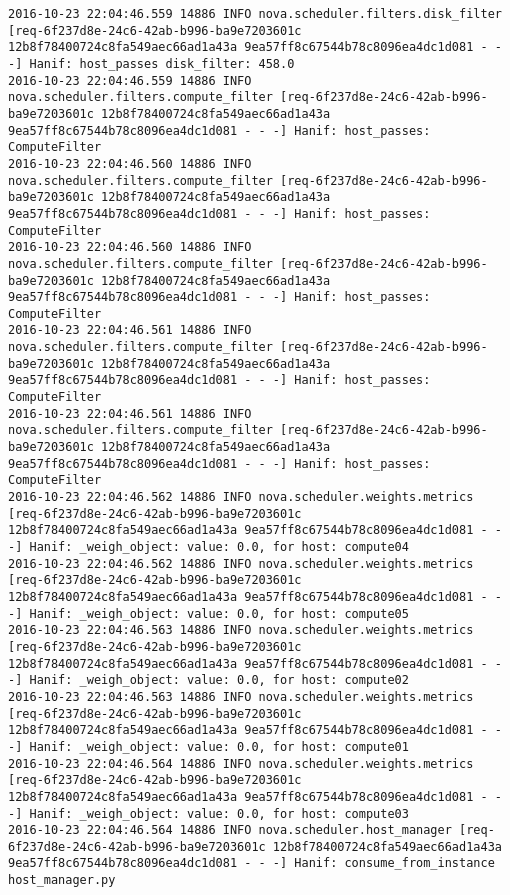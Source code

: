 \begin{lstlisting}[frame=single, caption={The filter scheduler code trace log}, label={lst:filterschedulercodetracelog}]
2016-10-23 22:04:46.559 14886 INFO nova.scheduler.filters.disk_filter [req-6f237d8e-24c6-42ab-b996-ba9e7203601c 12b8f78400724c8fa549aec66ad1a43a 9ea57ff8c67544b78c8096ea4dc1d081 - - -] Hanif: host_passes disk_filter: 458.0
2016-10-23 22:04:46.559 14886 INFO nova.scheduler.filters.compute_filter [req-6f237d8e-24c6-42ab-b996-ba9e7203601c 12b8f78400724c8fa549aec66ad1a43a 9ea57ff8c67544b78c8096ea4dc1d081 - - -] Hanif: host_passes: ComputeFilter
2016-10-23 22:04:46.560 14886 INFO nova.scheduler.filters.compute_filter [req-6f237d8e-24c6-42ab-b996-ba9e7203601c 12b8f78400724c8fa549aec66ad1a43a 9ea57ff8c67544b78c8096ea4dc1d081 - - -] Hanif: host_passes: ComputeFilter
2016-10-23 22:04:46.560 14886 INFO nova.scheduler.filters.compute_filter [req-6f237d8e-24c6-42ab-b996-ba9e7203601c 12b8f78400724c8fa549aec66ad1a43a 9ea57ff8c67544b78c8096ea4dc1d081 - - -] Hanif: host_passes: ComputeFilter
2016-10-23 22:04:46.561 14886 INFO nova.scheduler.filters.compute_filter [req-6f237d8e-24c6-42ab-b996-ba9e7203601c 12b8f78400724c8fa549aec66ad1a43a 9ea57ff8c67544b78c8096ea4dc1d081 - - -] Hanif: host_passes: ComputeFilter
2016-10-23 22:04:46.561 14886 INFO nova.scheduler.filters.compute_filter [req-6f237d8e-24c6-42ab-b996-ba9e7203601c 12b8f78400724c8fa549aec66ad1a43a 9ea57ff8c67544b78c8096ea4dc1d081 - - -] Hanif: host_passes: ComputeFilter
2016-10-23 22:04:46.562 14886 INFO nova.scheduler.weights.metrics [req-6f237d8e-24c6-42ab-b996-ba9e7203601c 12b8f78400724c8fa549aec66ad1a43a 9ea57ff8c67544b78c8096ea4dc1d081 - - -] Hanif: _weigh_object: value: 0.0, for host: compute04
2016-10-23 22:04:46.562 14886 INFO nova.scheduler.weights.metrics [req-6f237d8e-24c6-42ab-b996-ba9e7203601c 12b8f78400724c8fa549aec66ad1a43a 9ea57ff8c67544b78c8096ea4dc1d081 - - -] Hanif: _weigh_object: value: 0.0, for host: compute05
2016-10-23 22:04:46.563 14886 INFO nova.scheduler.weights.metrics [req-6f237d8e-24c6-42ab-b996-ba9e7203601c 12b8f78400724c8fa549aec66ad1a43a 9ea57ff8c67544b78c8096ea4dc1d081 - - -] Hanif: _weigh_object: value: 0.0, for host: compute02
2016-10-23 22:04:46.563 14886 INFO nova.scheduler.weights.metrics [req-6f237d8e-24c6-42ab-b996-ba9e7203601c 12b8f78400724c8fa549aec66ad1a43a 9ea57ff8c67544b78c8096ea4dc1d081 - - -] Hanif: _weigh_object: value: 0.0, for host: compute01
2016-10-23 22:04:46.564 14886 INFO nova.scheduler.weights.metrics [req-6f237d8e-24c6-42ab-b996-ba9e7203601c 12b8f78400724c8fa549aec66ad1a43a 9ea57ff8c67544b78c8096ea4dc1d081 - - -] Hanif: _weigh_object: value: 0.0, for host: compute03
2016-10-23 22:04:46.564 14886 INFO nova.scheduler.host_manager [req-6f237d8e-24c6-42ab-b996-ba9e7203601c 12b8f78400724c8fa549aec66ad1a43a 9ea57ff8c67544b78c8096ea4dc1d081 - - -] Hanif: consume_from_instance host_manager.py

\end{lstlisting}
